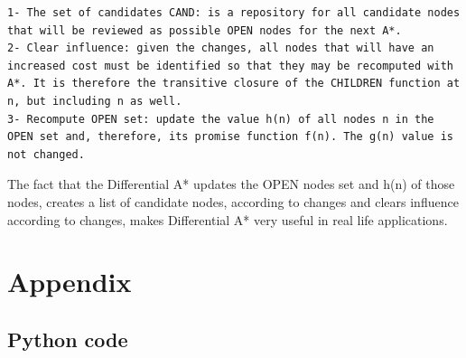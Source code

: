 \documentclass[12pt]{article}
\begin{document}
\begin{lstlisting}
1- The set of candidates CAND: is a repository for all candidate nodes that will be reviewed as possible OPEN nodes for the next A*.
2- Clear influence: given the changes, all nodes that will have an increased cost must be identified so that they may be recomputed with A*. It is therefore the transitive closure of the CHILDREN function at n, but including n as well.
3- Recompute OPEN set: update the value h(n) of all nodes n in the OPEN set and, therefore, its promise function f(n). The g(n) value is not changed.
\end{lstlisting}

The fact that the Differential A* updates the OPEN nodes set and h(n) of those nodes, creates a list of candidate nodes, according to changes and clears influence according to changes, makes Differential A* very useful in real life applications. 

\printbibliography

\section{Appendix}
\subsection{Python code}
\label{sec:pythonCode}

\end{document}
